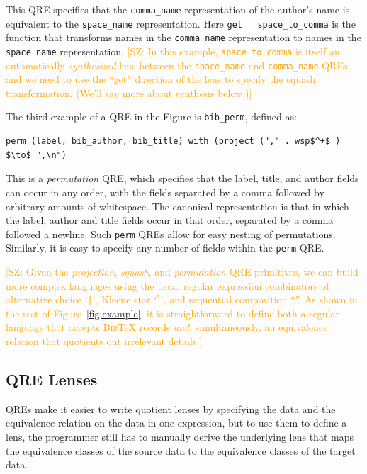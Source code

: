 \documentclass{svproc}
\newcommand{\cd}[1]{\lstinline[backgroundcolor=\color{white}]$#1$}
\newcommand{\FINISH}[3]{\ifdraft\textcolor{#1}{[#2: #3]}\fi}
\newcommand{\saz}[1]{\FINISH{orange}{SZ}{#1}}
\newcommand{\bibtex}{\textsc{Bib}\TeX{}}
\begin{document}
\noindent This QRE specifies that the \cd{comma_name} representation of the
author's name is equivalent to the \cd{space_name} representation.  Here \cd{get
  space_to_comma} is the function that transforms names in the \cd{comma_name}
representation to names in the \cd{space_name} representation.  \saz{In this
  example, \cd{space_to_comma} is itself an automatically \textit{synthesized}
  lens between the \cd{space_name} and \cd{comma_name} QREs, and we need to use
  the ``get'' direction of the lens to specify the squash transformation. (We'll
  say more about synthesis below.)}

The third example of a QRE in the Figure is \cd{bib_perm}, defined as:
\begin{center}
\begin{lstlisting}
perm (label, bib_author, bib_title) with (project ("," . wsp$^+$ ) $\to$ ",\n")
\end{lstlisting}
\end{center}

\noindent This is a \textit{permutation} QRE, which specifies that the label, title, and author fields can occur
in any order, with the fields separated by a comma followed by arbitrary amounts
of whitespace. The canonical representation is that in which the label, author
and title fields occur in that order, separated by a comma followed a newline.
Such \cd{perm} QREs allow for easy nesting of permutations. Similarly, it is easy
to specify any number of fields within the \cd{perm} QRE.

\saz{Given the \textit{projection}, \textit{squash}, and \textit{permutation}
  QRE primitives, we can build more complex languages using the usual regular
  expression combinators of alternative choice `\cd{|}', Kleene star `$^*$', and
  sequential composition ``.''.  As shown in the rest of
  Figure~\ref{fig:example}, it is straightforward to define both a regular
  language that accepts \bibtex{} records \textit{and}, simultaneously, an
  equivalence relation that quotients out irrelevant details.}

\subsection{QRE Lenses}
QREs make it easier to write quotient lenses by specifying the data and the
equivalence relation on the data in one expression, but to use them to define a
lens, the programmer still has to manually derive the underlying lens that maps
the equivalence classes of the source data to the equivalence classes of the
target data. 
\end{document}
